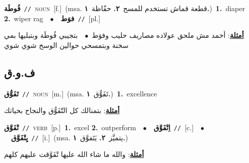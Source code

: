 \documentclass[10pt,a4paper,twoside]{article} %
\begin{document}
\begin{multicols}{2}
{\setlength\topsep{0pt}\textbf{\foreignlanguage{arabic}{فُوطَة}}\ {\color{gray}\texttt{//}\color{black}}\ \textsc{noun}\ [f.]\ \color{gray}(msa. \foreignlanguage{arabic}{قطعة قماش تستخدم للمسح}~\foreignlanguage{arabic}{\textbf{٢.}}  \foreignlanguage{arabic}{حفّاظة}~\foreignlanguage{arabic}{\textbf{١.}})\color{black}\ \textbf{1.}~diaper  \textbf{2.}~wiper rag\ \ $\bullet$\ \ \setlength\topsep{0pt}\textbf{\foreignlanguage{arabic}{فوَط}}\ {\color{gray}\texttt{//}\color{black}}\ [pl.]\  \begin{flushright}\color{gray}\foreignlanguage{arabic}{\textbf{\underline{\foreignlanguage{arabic}{أمثلة}}}: أخمد مش ملحق عولاده مصاريف حليب وفوَط\ $\bullet$\ \  بتجيبي فُوطَة وبتبليها بمي سخنة وبتمسحي حوالين الوسخ شوي شوي}\end{flushright}\color{black}} \vspace{2mm}

\vspace{-3mm}
\subsection*{\color{blue}\foreignlanguage{arabic}{ف.و.ق}\color{blue}{}} 

{\setlength\topsep{0pt}\textbf{\foreignlanguage{arabic}{تَفَوُّق}}\ {\color{gray}\texttt{//}\color{black}}\ \textsc{noun}\ [m.]\ \color{gray}(msa. \foreignlanguage{arabic}{تَفَوُّق}~\foreignlanguage{arabic}{\textbf{١.}})\color{black}\ \textbf{1.}~excellence\  \begin{flushright}\color{gray}\foreignlanguage{arabic}{\textbf{\underline{\foreignlanguage{arabic}{أمثلة}}}: بتمنالك كل التّفَوُّق والنجاح بحياتك}\end{flushright}\color{black}} \vspace{2mm}

{\setlength\topsep{0pt}\textbf{\foreignlanguage{arabic}{تْفَوَّق}}\ {\color{gray}\texttt{//}\color{black}}\ \textsc{verb}\ [p.]\ \textbf{1.}~excel  \textbf{2.}~outperform\ \ $\bullet$\ \ \setlength\topsep{0pt}\textbf{\foreignlanguage{arabic}{اِتْفَوَّق}}\ {\color{gray}\texttt{//}\color{black}}\ [c.]\ \ $\bullet$\ \ \setlength\topsep{0pt}\textbf{\foreignlanguage{arabic}{يِتْفَوَّق}}\ {\color{gray}\texttt{//}\color{black}}\ [i.]\ \color{gray}(msa. \foreignlanguage{arabic}{يتميَّز}~\foreignlanguage{arabic}{\textbf{٢.}}  \foreignlanguage{arabic}{يَتَفوَّق}~\foreignlanguage{arabic}{\textbf{١.}})\color{black}\  \begin{flushright}\color{gray}\foreignlanguage{arabic}{\textbf{\underline{\foreignlanguage{arabic}{أمثلة}}}: والله ما شاء الله عليها تْفَوَّقت عليهم كلهم}\end{flushright}\color{black}} \vspace{2mm}


\end{multicols}
\end{document}

